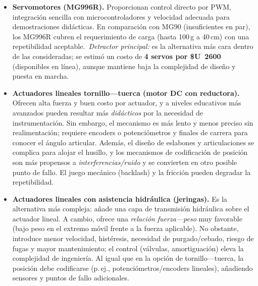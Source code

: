\begin{itemize}
  \item \textbf{Servomotores (MG996R).} Proporcionan control directo por PWM, integración sencilla con microcontroladores y velocidad adecuada para demostraciones didácticas. En comparación con MG90 (insuficientes en par), los MG996R cubren el requerimiento de carga (hasta 100\,g a 40\,cm) con una repetibilidad aceptable.\ \emph{Detractor principal:} es la alternativa más cara dentro de las consideradas; se estimó un costo de \textbf{4 servos por \mbox{\$U~2600}} (disponibles en línea), aunque mantiene baja la complejidad de diseño y puesta en marcha.

  \item \textbf{Actuadores lineales tornillo---tuerca (motor DC con reductora).} Ofrecen alta fuerza y buen costo por actuador, y a niveles educativos más avanzados pueden resultar más \emph{didácticos} por la necesidad de instrumentación. Sin embargo, el mecanismo es más lento y menos preciso sin realimentación; requiere encoders o potenciómetros y finales de carrera para conocer el ángulo articular. Además, el diseño de eslabones y articulaciones se complica para alojar el husillo, y los mecanismos de codificación de posición son más propensos a \emph{interferencias/ruido} y se convierten en otro posible punto de fallo. El juego mecánico (backlash) y la fricción pueden degradar la repetibilidad.

  \item \textbf{Actuadores lineales con asistencia hidráulica (jeringas).} Es la alternativa más compleja: añade una capa de transmisión hidráulica sobre el actuador lineal. A cambio, ofrece una \emph{relación fuerza---peso} muy favorable (bajo peso en el extremo móvil frente a la fuerza aplicable). No obstante, introduce menor velocidad, histéresis, necesidad de purgado/cebado, riesgo de fugas y mayor mantenimiento; el control (válvulas, amortiguación) eleva la complejidad de ingeniería. Al igual que en la opción de tornillo---tuerca, la posición debe codificarse (p.\,ej., potenciómetros/encoders lineales), añadiendo sensores y puntos de fallo adicionales.
\end{itemize}


